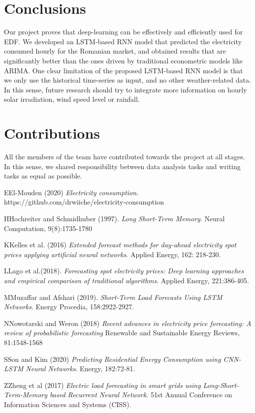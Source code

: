 \documentclass[10pt,twocolumn,letterpaper]{article}
\begin{document}
\section{Conclusions}
Our project proves that deep-learning can be effectively and efficiently used for EDF. We developed an LSTM-based RNN model that predicted the electricity consumed hourly for the Romanian market, and obtained results that are significantly better than the ones driven by traditional econometric models like ARIMA. One clear limitation of the proposed LSTM-based RNN model is that we only use the historical time-series as input, and no other weather-related data. In this sense, future research should try to integrate more information on hourly solar irradiation, wind speed level or rainfall.

\section{Contributions}

All the members of the team have contributed towards the project at all stages. In this sense, we shared responsibility between data analysis tasks and writing tasks as equal as possible. 


\begin{thebibliography}{}

\bibitem  EEl-Mouden (2020)
\textit {Electricity consumption}.
https://github.com/drwiiche/electricity-consumption


\bibitem  HHochreiter and Schmidhuber (1997).
\textit {Long Short-Term Memory}.
Neural Computation, 9(8):1735-1780

\bibitem KKelles et al. (2016)
\textit {Extended forecast methods for day-ahead electricity spot prices applying artificial neural networks}. Applied Energy, 162: 218-230.

\bibitem LLago et al.(2018).
\textit{Forecasting spot electricity prices: Deep learning approaches and empirical comparison of traditional algorithms}. 
Applied Energy, 221:386-405.

\bibitem  MMuzaffar and Afshari (2019).
\textit{Short-Term Load Forecasts Using LSTM Networks}. 
Energy Procedia, 158:2922-2927.

\bibitem NNowotarski and Weron (2018)
\textit {Recent advances in electricity price forecasting: A review of probabilistic forecasting} Renewable and Sustainable Energy Reviews, 81:1548-1568

\bibitem   SSon and Kim (2020)
\textit{Predicting Residential Energy Consumption using CNN-LSTM Neural Networks}. 
Energy, 182:72-81.

\bibitem    ZZheng  et  al (2017)
\textit{Electric load forecasting in smart grids using Long-Short-Term-Memory based Recurrent Neural Network}. 
51st Annual Conference on Information Sciences and Systems (CISS).


\end{thebibliography}
\end{document}
